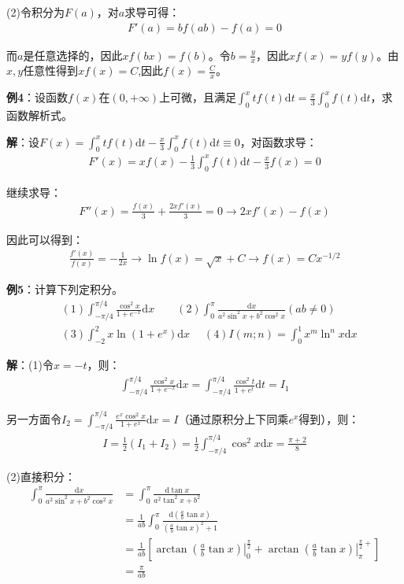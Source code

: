 \documentclass{ctexart}
\let\oldtextbf\textbf %
\renewcommand{\textbf}[1]{\textcolor{btex}{\oldtextbf{#1}}} %
\begin{document}
(2)令积分为$F(a)$，对$a$求导可得：
\begin{align*}
    F'(a)=bf(ab)-f(a)=0
\end{align*}

而$a$是任意选择的，因此$xf(bx)=f(b)$。令$b=\frac{y}{x}$，因此$xf(x)=yf(y)$。由$x,y$任意性得到$xf(x)=C$,因此$f(x)=\frac{C}{x}$。

\textbf{例4}：设函数$f(x)$在$(0,+\infty)$上可微，且满足$\int_0^x tf(t)\mathrm{d}t=\frac{x}{3}\int_0^xf(t)\mathrm{d}t$，求函数解析式。

\textbf{解}：设$F(x)=\int_0^xtf(t)\mathrm{d}t-\frac{x}{3}\int_0^x f(t)\mathrm{d}t\equiv 0$，对函数求导：
\begin{align*}
    F'(x)=xf(x)-\frac{1}{3}\int_0^xf(t)\mathrm{d}t-\frac{x}{3}f(x)=0
\end{align*}

继续求导：
\begin{align*}
    F''(x)=\frac{f(x)}{3}+\frac{2xf'(x)}{3}=0\to 2xf'(x)-f(x)
\end{align*}

因此可以得到：
\begin{align*}
    \frac{f'(x)}{f(x)}=-\frac{1}{2x}\to \ln f(x)=\sqrt{x}+C\to f(x)=Cx^{-1/2}
\end{align*}

\textbf{例5}：计算下列定积分。
\begin{align*}
&(1)\int_{-\pi/4}^{\pi/4}\frac{\cos^2 x}{1+e^{-x}}\mathrm{d}x\qquad (2)\int_0^\pi\frac{\mathrm
dx}{a^2\sin ^2x+b^2\cos^2x}(ab\neq 0)\\
&(3)\int_{-2}^2 x\ln(1+e^x)\mathrm{d}x\quad\;(4)I(m;n)=\int_0^1 x^m\ln^nx\mathrm{d}x    
\end{align*}

\textbf{解}：(1)令$x=-t$，则：
\begin{align*}
    \int_{-\pi/4}^{\pi/4}\frac{\cos^2 x}{1+e^{-x}}\mathrm{d}x=\int_{-\pi/4}^{\pi/4}\frac{\cos^2 t}{1+e^{t}}\mathrm{d}t=I_1
\end{align*}

另一方面令$I_2=\int_{-\pi/4}^{\pi/4}\frac{e^x\cos^2x}{1+e^x}\mathrm{d}x=I$（通过原积分上下同乘$e^x$得到），则：
\begin{align*}
    I=\frac{1}{2}(I_1+I_2)=\frac{1}{2}\int_{-\pi/4}^{\pi/4}\cos^2x\mathrm{d}x=\frac{\pi+2}{8}
\end{align*}

(2)直接积分：
\begin{align*}
\int_0^\pi\frac{\mathrm
dx}{a^2\sin ^2x+b^2\cos^2x}&=\int_0^\pi\frac{\mathrm{d}\tan x}{a^2\tan^2x+b^2}\\
&=\frac{1}{ab}\int_0^\pi\frac{\mathrm{d}(\frac{a}{b}\tan x) }{(\frac{a}{b}\tan x)^2+1 }\\
&=\frac{1}{ab}\left[\left.\arctan(\frac{a}{b}\tan x)\right|_0^{\frac{\pi}{2}}
+\left.\arctan(\frac{a}{b}\tan x )\right|_{\pi}^{\frac{\pi}{2}+} \right]\\
&=\frac{\pi}{ab}       
\end{align*}
\end{document}
